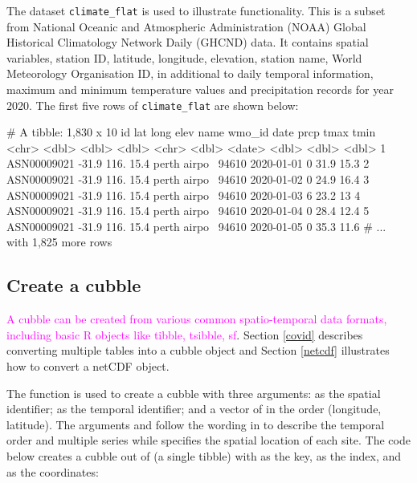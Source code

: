 \documentclass[
]{jss}
\begin{document}
The dataset \texttt{climate\_flat} is used to illustrate  functionality. This is a subset from National Oceanic and Atmospheric Administration (NOAA) Global Historical Climatology Network Daily (GHCND) data. It contains spatial variables, station ID, latitude, longitude, elevation, station name, World Meteorology Organisation ID, in additional to daily temporal information, maximum and minimum temperature values and precipitation records for year 2020. The first five rows of \texttt{climate\_flat} are shown below:

\begin{CodeChunk}
\begin{CodeOutput}
# A tibble: 1,830 x 10
  id            lat  long  elev name         wmo_id date        prcp  tmax  tmin
  <chr>       <dbl> <dbl> <dbl> <chr>         <dbl> <date>     <dbl> <dbl> <dbl>
1 ASN00009021 -31.9  116.  15.4 perth airpo~  94610 2020-01-01     0  31.9  15.3
2 ASN00009021 -31.9  116.  15.4 perth airpo~  94610 2020-01-02     0  24.9  16.4
3 ASN00009021 -31.9  116.  15.4 perth airpo~  94610 2020-01-03     6  23.2  13  
4 ASN00009021 -31.9  116.  15.4 perth airpo~  94610 2020-01-04     0  28.4  12.4
5 ASN00009021 -31.9  116.  15.4 perth airpo~  94610 2020-01-05     0  35.3  11.6
# ... with 1,825 more rows
\end{CodeOutput}
\end{CodeChunk}

\hypertarget{create}{%
\subsection{Create a cubble}\label{create}}

\textcolor{magenta}{A cubble can be created from various common spatio-temporal data formats, including basic R objects like tibble, tsibble, sf}. Section \ref{covid} describes converting multiple tables into a cubble object and Section \ref{netcdf} illustrates how to convert a netCDF object.

The function  is used to create a cubble with three arguments:  as the spatial identifier;  as the temporal identifier; and a vector of  in the order (longitude, latitude). The arguments  and  follow the wording in  to describe the temporal order and multiple series while  specifies the spatial location of each site. The code below creates a cubble out of  (a single tibble) with  as the key,  as the index, and  as the coordinates:
\end{document}
